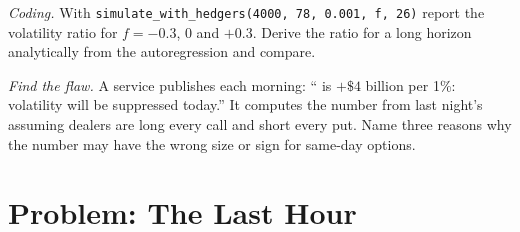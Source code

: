 \begin{exercise}[$\star\star\star$]\label{exo:m1:zero-day-options-and-retail-flow:7}
\emph{Coding.} With \texttt{simulate\_with\_hedgers(4000, 78, 0.001, f, 26)}
report the volatility ratio for $f = -0.3$, 0 and $+0.3$. Derive the ratio for
a long horizon analytically from the autoregression and compare.
\end{exercise}

\begin{exercise}[$\star\star\star$]\label{exo:m1:zero-day-options-and-retail-flow:8}
\emph{Find the flaw.} A service publishes each morning: `` is
$+\$4$ billion per 1\%: volatility will be suppressed today.'' It computes the
number from last night's  assuming dealers are long every call
and short every put. Name three reasons why the number may have the wrong
size or sign for same-day options.
\end{exercise}

\section{Problem: The Last Hour}

